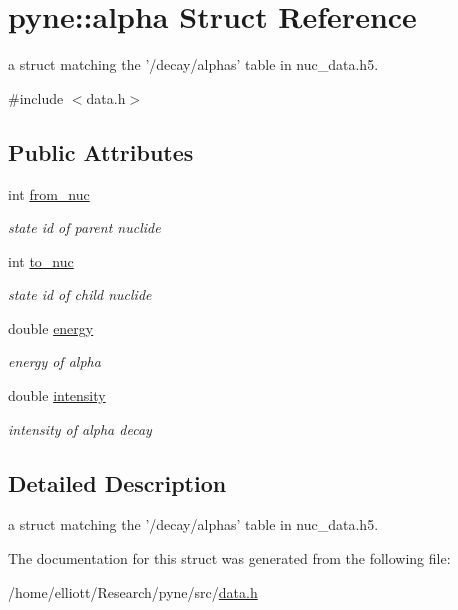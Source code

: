 \hypertarget{structpyne_1_1alpha}{\section{pyne\-:\-:alpha Struct Reference}
\label{structpyne_1_1alpha}
}


a struct matching the '/decay/alphas' table in nuc\-\_\-data.\-h5.  




{\ttfamily \#include $<$data.\-h$>$}

\subsection*{Public Attributes}
\begin{DoxyCompactItemize}
\item 
\hypertarget{structpyne_1_1alpha_af41fd4e97378d30f3fbc9f01999b2d2a}{int \hyperlink{structpyne_1_1alpha_af41fd4e97378d30f3fbc9f01999b2d2a}{from\-\_\-nuc}}\label{structpyne_1_1alpha_af41fd4e97378d30f3fbc9f01999b2d2a}

\begin{DoxyCompactList}\small\item\em state id of parent nuclide \end{DoxyCompactList}\item 
\hypertarget{structpyne_1_1alpha_ab099ce46072d7022caf1a49de2e0974b}{int \hyperlink{structpyne_1_1alpha_ab099ce46072d7022caf1a49de2e0974b}{to\-\_\-nuc}}\label{structpyne_1_1alpha_ab099ce46072d7022caf1a49de2e0974b}

\begin{DoxyCompactList}\small\item\em state id of child nuclide \end{DoxyCompactList}\item 
\hypertarget{structpyne_1_1alpha_a5f1aa6a1d0e8c02a0967ee160e35fdb2}{double \hyperlink{structpyne_1_1alpha_a5f1aa6a1d0e8c02a0967ee160e35fdb2}{energy}}\label{structpyne_1_1alpha_a5f1aa6a1d0e8c02a0967ee160e35fdb2}

\begin{DoxyCompactList}\small\item\em energy of alpha \end{DoxyCompactList}\item 
\hypertarget{structpyne_1_1alpha_a56e40c800fbe36f1d62113ddf4c162e7}{double \hyperlink{structpyne_1_1alpha_a56e40c800fbe36f1d62113ddf4c162e7}{intensity}}\label{structpyne_1_1alpha_a56e40c800fbe36f1d62113ddf4c162e7}

\begin{DoxyCompactList}\small\item\em intensity of alpha decay \end{DoxyCompactList}\end{DoxyCompactItemize}


\subsection{Detailed Description}
a struct matching the '/decay/alphas' table in nuc\-\_\-data.\-h5. 

The documentation for this struct was generated from the following file\-:\begin{DoxyCompactItemize}
\item 
/home/elliott/\-Research/pyne/src/\hyperlink{data_8h}{data.\-h}\end{DoxyCompactItemize}
